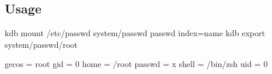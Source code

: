 \subsection*{Usage}

\begin{DoxyVerb}kdb mount /etc/passwd system/passwd passwd index=name
kdb export system/passwd/root

gecos = root
gid = 0
home = /root
passwd = x
shell = /bin/zsh
uid = 0\end{DoxyVerb}
 